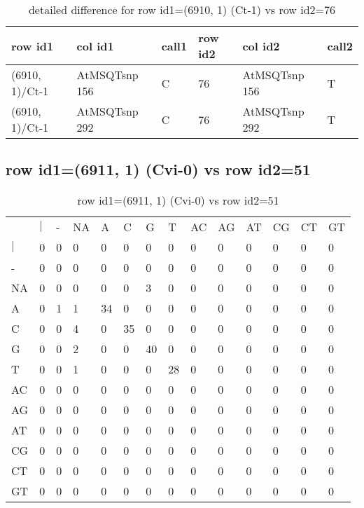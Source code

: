 \begin{center}
\begin{longtable}{|l|l|l|l|l|l|}
\caption{detailed difference for row id1=(6910, 1) (Ct-1) vs row id2=76} \label{table_dm87}\\
\hline
row id1&col id1&call1&row id2&col id2&call2\\
\hline
(6910, 1)/Ct-1&AtMSQTsnp 156&C&76&AtMSQTsnp 156&T\\
(6910, 1)/Ct-1&AtMSQTsnp 292&C&76&AtMSQTsnp 292&T\\
\hline
\end{longtable}
\end{center}

\subsection{row id1=(6911, 1) (Cvi-0) vs row id2=51}
\begin{center}
\begin{longtable}{|l|l|l|l|l|l|l|l|l|l|l|l|l|l|}
\caption{row id1=(6911, 1) (Cvi-0) vs row id2=51} \label{table_dm88}\\
\hline
\\
\hline
&$|$&-&NA&A&C&G&T&AC&AG&AT&CG&CT&GT\\
$|$&0&0&0&0&0&0&0&0&0&0&0&0&0\\
-&0&0&0&0&0&0&0&0&0&0&0&0&0\\
NA&0&0&0&0&0&3&0&0&0&0&0&0&0\\
A&0&1&1&34&0&0&0&0&0&0&0&0&0\\
C&0&0&4&0&35&0&0&0&0&0&0&0&0\\
G&0&0&2&0&0&40&0&0&0&0&0&0&0\\
T&0&0&1&0&0&0&28&0&0&0&0&0&0\\
AC&0&0&0&0&0&0&0&0&0&0&0&0&0\\
AG&0&0&0&0&0&0&0&0&0&0&0&0&0\\
AT&0&0&0&0&0&0&0&0&0&0&0&0&0\\
CG&0&0&0&0&0&0&0&0&0&0&0&0&0\\
CT&0&0&0&0&0&0&0&0&0&0&0&0&0\\
GT&0&0&0&0&0&0&0&0&0&0&0&0&0\\
\hline
\end{longtable}
\end{center}

